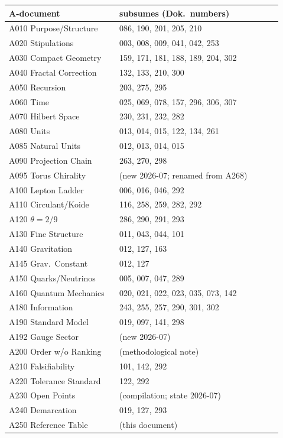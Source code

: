 \begin{center}
\small
\begin{longtable}{@{}p{0.38\linewidth}p{0.56\linewidth}@{}}
\hline
A-document & subsumes (Dok.\ numbers) \\
\hline
\endhead
A010 Purpose/Structure   & 086, 190, 201, 205, 210 \\
A020 Stipulations        & 003, 008, 009, 041, 042, 253 \\
A030 Compact Geometry    & 159, 171, 181, 188, 189, 204, 302 \\
A040 Fractal Correction  & 132, 133, 210, 300 \\
A050 Recursion           & 203, 275, 295 \\
A060 Time                & 025, 069, 078, 157, 296, 306, 307 \\
A070 Hilbert Space       & 230, 231, 232, 282 \\
A080 Units               & 013, 014, 015, 122, 134, 261 \\
A085 Natural Units       & 012, 013, 014, 015 \\
A090 Projection Chain    & 263, 270, 298 \\
A095 Torus Chirality     & (new 2026-07; renamed from A268) \\
A100 Lepton Ladder       & 006, 016, 046, 292 \\
A110 Circulant/Koide     & 116, 258, 259, 282, 292 \\
A120 $\theta=2/9$        & 286, 290, 291, 293 \\
A130 Fine Structure      & 011, 043, 044, 101 \\
A140 Gravitation         & 012, 127, 163 \\
A145 Grav.\ Constant     & 012, 127 \\
A150 Quarks/Neutrinos    & 005, 007, 047, 289 \\
A160 Quantum Mechanics   & 020, 021, 022, 023, 035, 073, 142 \\
A180 Information         & 243, 255, 257, 290, 301, 302 \\
A190 Standard Model      & 019, 097, 141, 298 \\
A192 Gauge Sector        & (new 2026-07) \\
A200 Order w/o Ranking   & (methodological note) \\
A210 Falsifiability      & 101, 142, 292 \\
A220 Tolerance Standard  & 122, 292 \\
A230 Open Points         & (compilation; state 2026-07) \\
A240 Demarcation         & 019, 127, 293 \\
A250 Reference Table     & (this document) \\
\hline
\end{longtable}
\end{center}

